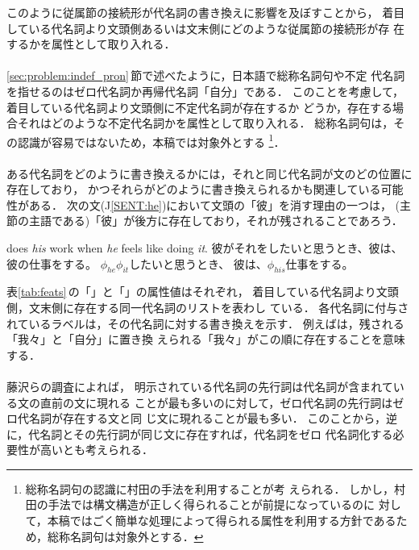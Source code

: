 このように従属節の接続形が代名詞の書き換えに影響を及ぼすことから，
着目している代名詞より文頭側あるいは文末側にどのような従属節の接続形が存
在するかを属性として取り入れる．

\paragraph{\INDEFPRON}

\ref{sec:problem:indef_pron}\,節で述べたように，日本語で総称名詞句や不定
代名詞を指せるのはゼロ代名詞か再帰代名詞「自分」である．
このことを考慮して，着目している代名詞より文頭側に不定代名詞が存在するか
どうか，存在する場合それはどのような不定代名詞かを属性として取り入れる．
総称名詞句は，その認識が容易ではないため，本稿では対象外とする
\footnote{総称名詞句の認識に村田の手法\cite{Murata96}を利用することが考
えられる．
しかし，村田の手法では構文構造が正しく得られることが前提になっているのに
対して，本稿ではごく簡単な処理によって得られる属性を利用する方針であるた
め，総称名詞句は対象外とする．}．

\paragraph{\SAMEPRON}

ある代名詞をどのように書き換えるかには，それと同じ代名詞が文のどの位置に
存在しており，
かつそれらがどのように書き換えられるかも関連している可能性がある．
次の文(J\ref{SENT:he})において文頭の「彼」を消す理由の一つは，
(主節の主語である)「彼」が後方に存在しており，それが残されることであろう．
\begin{SENT2}
 does {\it his} work when {\it he} feels like 
doing {\it it}.
\sentJ 彼がそれをしたいと思うとき、彼は、彼の仕事をする。
\NewsentJ $\phi_{he}$$\phi_{it}$したいと思うとき、
彼は、$\phi_{his}$仕事をする。
\label{SENT:he}
\end{SENT2}

表\ref{tab:feats}\,の「\SAMEPRONB」と「\SAMEPRONF」の属性値はそれぞれ，
着目している代名詞より文頭側，文末側に存在する同一代名詞のリストを表わし
ている．
各代名詞に付与されているラベルは，その代名詞に対する書き換えを示す．
例えばは，残される「我々」と「自分」に置き換
えられる「我々」がこの順に存在することを意味する．

\paragraph{\ANAPH}

藤沢らの調査\cite{Fujisawa93}によれば，
明示されている代名詞の先行詞は代名詞が含まれている文の直前の文に現れる
ことが最も多いのに対して，ゼロ代名詞の先行詞はゼロ代名詞が存在する文と同
じ文に現れることが最も多い．
このことから，逆に，代名詞とその先行詞が同じ文に存在すれば，代名詞をゼロ
代名詞化する必要性が高いとも考えられる．

